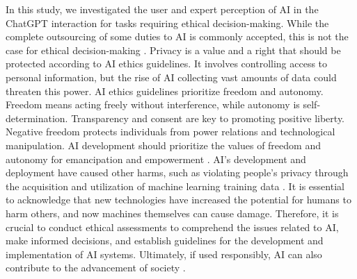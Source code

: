 \documentclass[sigconf]{acmart}
\begin{document}
In this study, we investigated the user and expert perception of AI in the ChatGPT interaction for tasks requiring ethical decision-making. While the complete outsourcing of some duties to AI is commonly accepted, this is not the case for ethical decision-making \cite{fast2017long}. Privacy is a value and a right that should be protected according to AI ethics guidelines. It involves controlling access to personal information, but the rise of AI collecting vast amounts of data could threaten this power. AI ethics guidelines prioritize freedom and autonomy. Freedom means acting freely without interference, while autonomy is self-determination. Transparency and consent are key to promoting positive liberty. Negative freedom protects individuals from power relations and technological manipulation. AI development should prioritize the values of freedom and autonomy for emancipation and empowerment \cite{Rosalie2022Why}. AI's development and deployment have caused other harms, such as violating people's privacy through the acquisition and utilization of machine learning training data \cite{Thiebes2020Trustworthy}. It is essential to acknowledge that new technologies have increased the potential for humans to harm others, and now machines themselves can cause damage. Therefore, it is crucial to conduct ethical assessments to comprehend the issues related to AI, make informed decisions, and establish guidelines for the development and implementation of AI systems. Ultimately, if used responsibly, AI can also contribute to the advancement of society \cite{Daza2022survey}.
\end{document}
